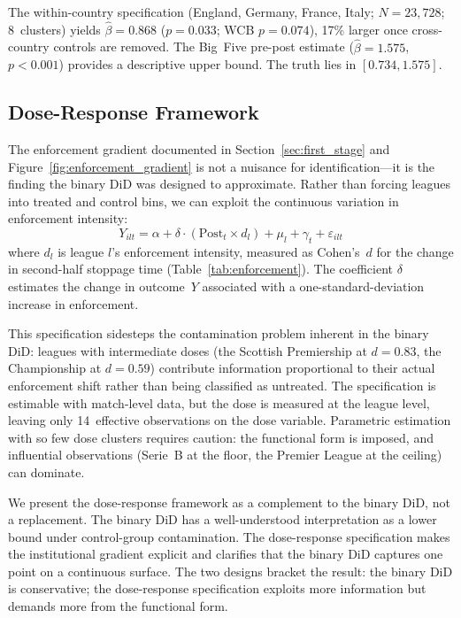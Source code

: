 The within-country specification (England, Germany, France, Italy;
$N = 23{,}728$; 8~clusters) yields $\hat{\beta} = 0.868$
($p = 0.033$; WCB $p = 0.074$), 17\% larger once cross-country
controls are removed. The Big~Five pre-post estimate
($\hat{\beta} = 1.575$, $p < 0.001$) provides a descriptive upper
bound. The truth lies in $[0.734, 1.575]$.


\subsection{Dose-Response Framework}
\label{subsec:dose_response}

The enforcement gradient documented in Section~\ref{sec:first_stage}
and Figure~\ref{fig:enforcement_gradient} is not a nuisance for
identification---it is the finding the binary DiD was designed to
approximate. Rather than forcing leagues into treated and control
bins, we can exploit the continuous variation in enforcement intensity:
%
\begin{equation}\label{eq:dose}
  Y_{ilt} = \alpha + \delta \cdot (\text{Post}_t \times d_l)
  + \mu_l + \gamma_t + \varepsilon_{ilt}
\end{equation}
%
where $d_l$ is league $l$'s enforcement intensity, measured as
Cohen's~$d$ for the change in second-half stoppage time
(Table~\ref{tab:enforcement}). The coefficient $\delta$ estimates the
change in outcome~$Y$ associated with a one-standard-deviation increase
in enforcement.

This specification sidesteps the contamination problem inherent in the
binary DiD: leagues with intermediate doses (the Scottish Premiership
at $d = 0.83$, the Championship at $d = 0.59$) contribute information
proportional to their actual enforcement shift rather than being
classified as untreated. The specification is estimable with
match-level data, but the dose is measured at the league level,
leaving only 14~effective observations on the dose variable.
Parametric estimation with so few dose clusters requires caution:
the functional form is imposed, and influential observations
(Serie~B at the floor, the Premier League at the ceiling) can
dominate.

We present the dose-response framework as a complement to the binary
DiD, not a replacement. The binary DiD has a well-understood
interpretation as a lower bound under control-group contamination.
The dose-response specification makes the institutional gradient
explicit and clarifies that the binary DiD captures one point on a
continuous surface. The two designs bracket the result: the binary DiD
is conservative; the dose-response specification exploits more
information but demands more from the functional form.


